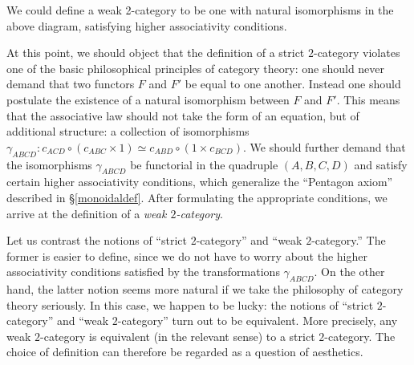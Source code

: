 \begin{1.1.1 Goals and Obstacles}
\begin{shaded}
We could define a weak 2-category to be one with natural isomorphisms in the above diagram, satisfying higher associativity conditions.
\end{shaded}


At this point, we should object that the definition of a strict
$2$-category violates one of the basic philosophical principles of
category theory: one should never demand that two functors $F$ and $F'$ be
equal to one another. Instead one should postulate the existence of a natural
isomorphism between $F$ and $F'$. This means that the associative
law should not take the form of an equation, but of additional
structure: a collection of isomorphisms $\gamma_{ABCD}: c_{ACD} \circ
(c_{ABC} \times 1) \simeq c_{ABD} \circ (1 \times c_{BCD})$. We
should further demand that the isomorphisms $\gamma_{ABCD}$ be
functorial in the quadruple $(A,B,C,D)$ and satisfy
certain higher associativity conditions, which generalize the ``Pentagon axiom''
described in \S \ref{monoidaldef}. After formulating the
appropriate conditions, we arrive at the definition of a {\it weak
$2$-category}.


Let us contrast the notions of ``strict $2$-category'' and ``weak
$2$-category.'' The former is easier to define, since we do not
have to worry about the higher associativity conditions satisfied
by the transformations $\gamma_{ABCD}$. On the other hand, the
latter notion seems more natural if we take the philosophy of
category theory seriously. In this case, we happen to be lucky:
the notions of ``strict $2$-category'' and ``weak $2$-category''
turn out to be equivalent. More precisely, any weak $2$-category
is equivalent (in the relevant sense) to a strict $2$-category. The
choice of definition can therefore be regarded as a question of
aesthetics.


\end{1.1.1 Goals and Obstacles}
